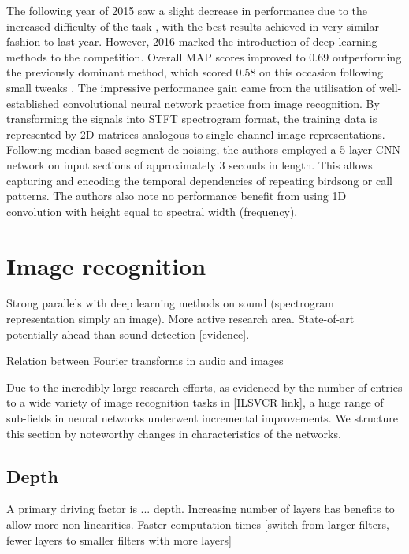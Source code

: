 \documentclass[12pt]{llncs}
\begin{document}
The following year of 2015 saw a slight decrease in performance due to the increased difficulty of the task \cite{goeau2015lifeclef}, with the best results achieved in very similar fashion to last year. However, 2016 marked the introduction of deep learning methods to the competition. Overall MAP scores improved to 0.69 outperforming the previously dominant method, which scored 0.58  on this occasion following small tweaks \cite{joly2016lifeclef}. The impressive performance gain came from the utilisation of well-established convolutional neural network practice from image recognition. By transforming the signals into STFT spectrogram format, the training data is represented by 2D matrices analogous to single-channel image representations. Following median-based segment de-noising, the authors employed a 5 layer CNN network on input sections of approximately 3 seconds in length. This allows capturing and encoding the temporal dependencies of repeating birdsong or call patterns. The authors also note no performance benefit from using 1D convolution with height equal to spectral width (frequency).

\section{Image recognition}
\label{sec:imagerecognition}
Strong parallels with deep learning methods on sound (spectrogram representation simply an image). More active research area. State-of-art potentially ahead than sound detection [evidence].


Relation between Fourier transforms in audio and images



Due to the incredibly large research efforts, as evidenced by the number of entries to a wide variety of image recognition tasks in [ILSVCR link], a huge range of sub-fields in neural networks underwent incremental improvements. We structure this section by noteworthy changes in characteristics of the networks.

\subsection{Depth}
A primary driving factor is ... depth. Increasing number of layers has benefits to allow more non-linearities. Faster computation times [switch from larger filters, fewer layers to smaller filters with more layers]
\end{document}
